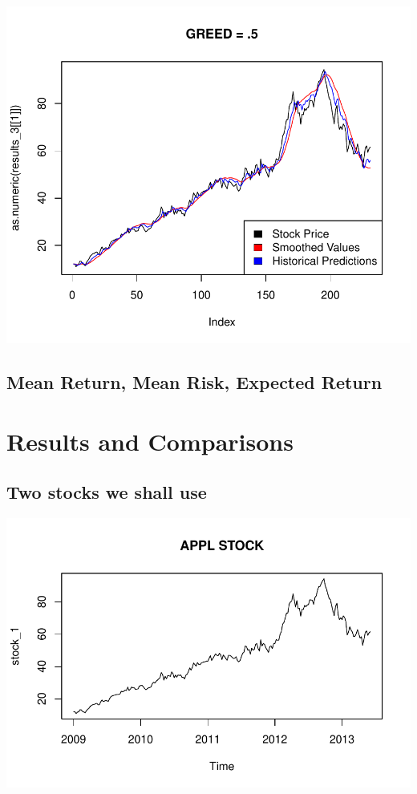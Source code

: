 \documentclass[english]{report}
\begin{document}
\includegraphics{MV_report-005}

\newpage
\subsection{ Mean Return, Mean Risk, Expected Return}

\section{Results and Comparisons}

\subsection{Two stocks we shall use}

\includegraphics{MV_report-006}
\end{document}
